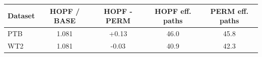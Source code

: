 \begin{tabular}{lcccc}
\toprule
Dataset & HOPF / BASE & HOPF - PERM & HOPF eff. paths & PERM eff. paths \\
\midrule
PTB & 1.081 & +0.13 & 46.0 & 45.8 \\
WT2 & 1.081 & -0.03 & 40.9 & 42.3 \\
\bottomrule
\end{tabular}
